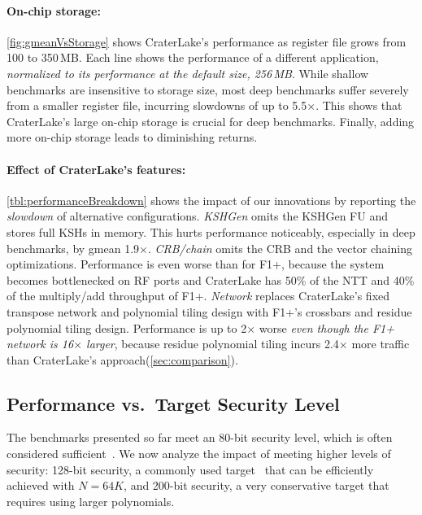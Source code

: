 \paragraph{On-chip storage:}
\autoref{fig:gmeanVsStorage} shows CraterLake's performance as register file
grows from 100 to 350\,MB. Each line shows the performance of a different
application, \emph{normalized to its performance at the default size, 256\,MB}.
While shallow benchmarks are insensitive to storage size, most deep benchmarks
suffer severely from a smaller register file, incurring slowdowns of up to
5.5$\times$. This shows that CraterLake's large on-chip storage is crucial for
deep benchmarks. Finally, adding more on-chip storage leads to diminishing
returns.


\paragraph{Effect of CraterLake's features:}
\autoref{tbl:performanceBreakdown} shows the impact of our innovations by
reporting the \emph{slowdown} of alternative configurations. \emph{KSHGen}
omits the KSHGen FU and stores full KSHs in memory. This hurts performance
noticeably, especially in deep benchmarks, by gmean 1.9$\times$.
\emph{CRB/chain} omits the CRB and the vector chaining optimizations.
Performance is even worse than for F1+, because the system becomes bottlenecked
on RF ports and CraterLake has 50\% of the NTT and 40\% of the multiply/add
throughput of F1+. \emph{Network} replaces CraterLake's fixed transpose network
and polynomial tiling design with F1+'s crossbars and residue polynomial tiling
design. Performance is up to 2$\times$ worse \emph{even though the F1+ network
is 16$\times$ larger}, because residue polynomial tiling incurs 2.4$\times$
more traffic than CraterLake's approach(\autoref{sec:comparison}).

\subsection{Performance vs.\ Target Security Level}
\label{sec:moreSecurity}

The benchmarks presented so far meet an 80-bit security level, which is often
considered
sufficient~\cite{halevi2021bootstrapping,halevi2018faster,izabachene2019practical,ji2019efficient}.
We now analyze the impact of meeting higher levels of security: 128-bit
security, a commonly used
target~\cite{albrecht:hesg18:standard,lee:2021:privacy,riazi:asplos20:heax}
that can be efficiently achieved with $N =64K$, and 200-bit security, a very
conservative target that requires using larger polynomials.

